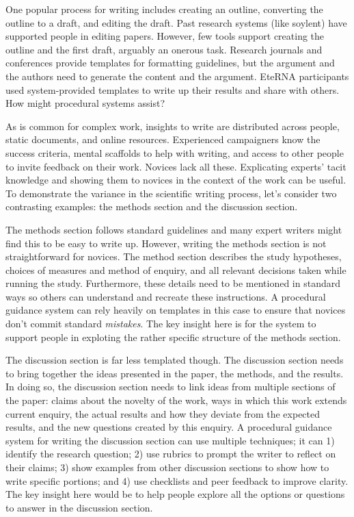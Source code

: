 One popular process for writing includes creating an outline, converting the outline to a draft, and editing the draft. Past research systems (like soylent) have supported people in editing papers. However, few tools support creating the outline and the first draft, arguably an onerous task. Research journals and conferences provide templates for formatting guidelines, but the argument and the authors need to generate the content and the argument. EteRNA participants used system-provided templates to write up their results and share with others. How might procedural systems assist?

As is common for complex work, insights to write are distributed across people, static documents, and online resources. Experienced campaigners know the success criteria, mental scaffolds to help with writing, and access to other people to invite feedback on their work. Novices lack all these. Explicating experts' tacit knowledge and showing them to novices in the context of the work can be useful. To demonstrate the variance in the scientific writing process, let’s consider two contrasting examples: the methods section and the discussion section.

The methods section follows standard guidelines and many expert writers might find this to be easy to write up. However, writing the methods section is not straightforward for novices. The method section describes the study hypotheses, choices of measures and method of enquiry, and all relevant decisions taken while running the study. Furthermore, these details need to be mentioned in standard ways so others can understand and recreate these instructions. A procedural guidance system can rely heavily on templates in this case to ensure that novices don't commit standard \textit{mistakes}. The key insight here is for the system to support people in exploting the rather specific structure of the methods section.

The discussion section is far less templated though. The discussion section needs to bring together the ideas presented in the paper, the methods, and the results. In doing so, the discussion section needs to link ideas from multiple sections of the paper: claims about the novelty of the work, ways in which this work extends current enquiry, the actual results and how they deviate from the expected results, and the new questions created by this enquiry. A procedural guidance system for writing the discussion section can use multiple techniques; it can 1) identify the research question; 2) use rubrics to prompt the writer to reflect on their claims; 3) show examples from other discussion sections to show how to write specific portions; and 4) use checklists and peer feedback to improve clarity. The key insight here would be to help people explore all the options or questions to answer in the discussion section.


